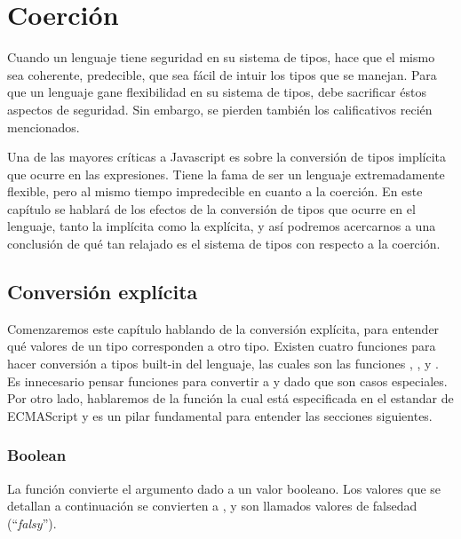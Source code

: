 \chapter{Coerción} %

\label{ch:coercion} %

Cuando un lenguaje tiene seguridad en su sistema de tipos, hace que el mismo sea coherente, predecible, que sea fácil de intuir los tipos que se manejan. Para que un lenguaje gane flexibilidad en su sistema de tipos, debe sacrificar éstos aspectos de seguridad. Sin embargo, se pierden también los calificativos recién mencionados.

Una de las mayores críticas a Javascript es sobre la conversión de tipos implícita que ocurre en las expresiones. Tiene la fama de ser un lenguaje extremadamente flexible, pero al mismo tiempo impredecible en cuanto a la coerción. En este capítulo se hablará de los efectos de la conversión de tipos que ocurre en el lenguaje, tanto la implícita como la explícita, y así podremos acercarnos a una conclusión de qué tan relajado es el sistema de tipos con respecto a la coerción.

\section{Conversión explícita}
\label{sec:conversionexplicita}

Comenzaremos este capítulo hablando de la conversión explícita, para entender qué valores de un tipo corresponden a otro tipo. Existen cuatro funciones para hacer conversión a tipos built-in del lenguaje, las cuales son las funciones , ,  y . Es innecesario pensar funciones para convertir a  y  dado que son casos especiales. Por otro lado, hablaremos de la función  la cual está especificada en el estandar de ECMAScript y es un pilar fundamental para entender las secciones siguientes.

\subsection{Boolean} 

La función  convierte el argumento dado a un valor booleano. Los valores que se detallan a continuación se convierten a , y son llamados valores de falsedad ("`\textit{falsy}"').

